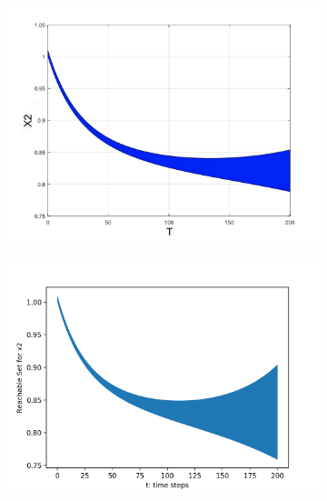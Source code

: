 \documentclass[EPiC]{easychair}
\begin{document}
\begin{figure}[h]
     \hspace{-12ex}
    \begin{subfigure}{0.6\textwidth}
    \centering
    \includegraphics[width=1.15\textwidth]{SapoFigures/Phos/SapoPhos_X2.jpg}
    \end{subfigure}
    \begin{subfigure}{0.6\textwidth}
    \centering
    \includegraphics[width=1.12\textwidth]{SapoFigures/Phos/KaaPhos_X2.png}
    \end{subfigure}
    

\end{figure}
\end{document}
